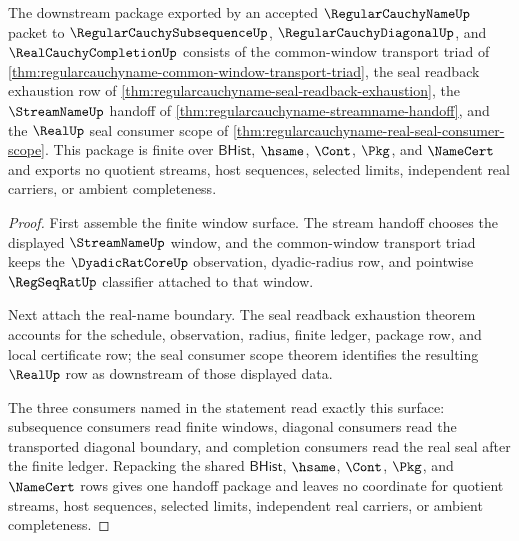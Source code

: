 \begin{theorem}
\label{thm:regularcauchyname-downstream-completion-handoff-package}
The downstream package exported by an accepted $\RegularCauchyNameUp$ packet to $\RegularCauchySubsequenceUp$, $\RegularCauchyDiagonalUp$, and $\RealCauchyCompletionUp$ consists of the common-window transport triad of \autoref{thm:regularcauchyname-common-window-transport-triad}, the seal readback exhaustion row of \autoref{thm:regularcauchyname-seal-readback-exhaustion}, the $\StreamNameUp$ handoff of \autoref{thm:regularcauchyname-streamname-handoff}, and the $\RealUp$ seal consumer scope of \autoref{thm:regularcauchyname-real-seal-consumer-scope}. This package is finite over $\mathsf{BHist}$, $\hsame$, $\Cont$, $\Pkg$, and $\NameCert$ and exports no quotient streams, host sequences, selected limits, independent real carriers, or ambient completeness.
\end{theorem}
\begin{proof}
First assemble the finite window surface. The stream handoff chooses the displayed $\StreamNameUp$ window, and the common-window transport triad keeps the $\DyadicRatCoreUp$ observation, dyadic-radius row, and pointwise $\RegSeqRatUp$ classifier attached to that window.

Next attach the real-name boundary. The seal readback exhaustion theorem accounts for the schedule, observation, radius, finite ledger, package row, and local certificate row; the seal consumer scope theorem identifies the resulting $\RealUp$ row as downstream of those displayed data.

The three consumers named in the statement read exactly this surface: subsequence consumers read finite windows, diagonal consumers read the transported diagonal boundary, and completion consumers read the real seal after the finite ledger. Repacking the shared $\mathsf{BHist}$, $\hsame$, $\Cont$, $\Pkg$, and $\NameCert$ rows gives one handoff package and leaves no coordinate for quotient streams, host sequences, selected limits, independent real carriers, or ambient completeness.
\end{proof}

